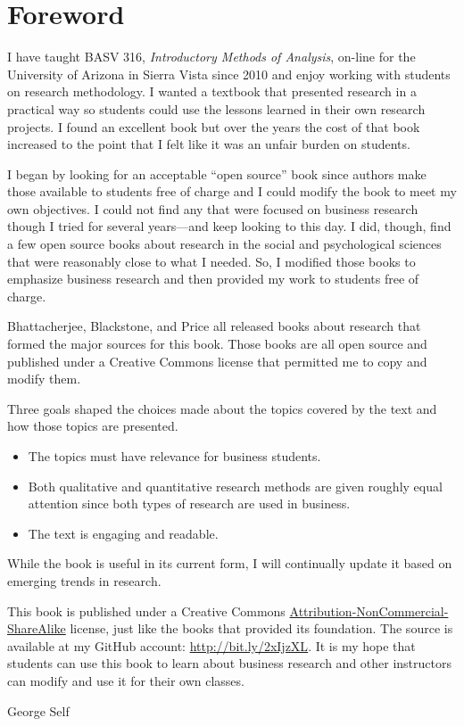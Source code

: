 \chapter*{Foreword}\label{ch:foreword}

I have taught BASV 316, \textit{Introductory Methods of Analysis}, on-line for the University of Arizona in Sierra Vista since 2010 and enjoy working with students on research methodology. I wanted a textbook that presented research in a practical way so students could use the lessons learned in their own research projects. I found an excellent book but over the years the cost of that book increased to the point that I felt like it was an unfair burden on students. 

I began by looking for an acceptable ``open source'' book since authors make those available to students free of charge and I could modify the book to meet my own objectives. I could not find any that were focused on business research though I tried for several years—and keep looking to this day. I did, though, find a few open source books about research in the social and psychological sciences that were reasonably close to what I needed. So, I modified those books to emphasize business research and then provided my work to students free of charge. 

Bhattacherjee\cite{bhattacherjee2012social}, Blackstone\cite{blackstone2012principles}, and Price\cite{price2015research} all released books about research that formed the major sources for this book. Those books are all open source and published under a Creative Commons license that permitted me to copy and modify them.

Three goals shaped the choices made about the topics covered by the text and how those topics are presented. 

\begin{itemize}
	\item The topics must have relevance for business students. 
	\item Both qualitative and quantitative research methods are given roughly equal attention since both types of research are used in business. 
	\item The text is engaging and readable.
\end{itemize}

While the book is useful in its current form, I will continually update it based on emerging trends in research. 

This book is published under a Creative Commons \href{https://creativecommons.org/licenses/by-nc-sa/4.0/legalcode}{ Attribution-NonCommercial-ShareAlike} license, just like the books that provided its foundation. The source is available at my GitHub account: \url{http://bit.ly/2xIjzXL}. It is my hope that students can use this book to learn about business research and other instructors can modify and use it for their own classes.

\bigskip
\begin{flushright}
  \textemdash \; George Self
\end{flushright}
